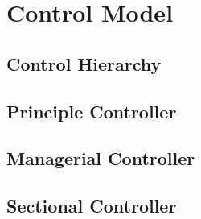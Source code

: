 \chapter{Control Model}
\section{Control Hierarchy}
\section{Principle Controller}
\section{Managerial Controller}
\section{Sectional Controller}